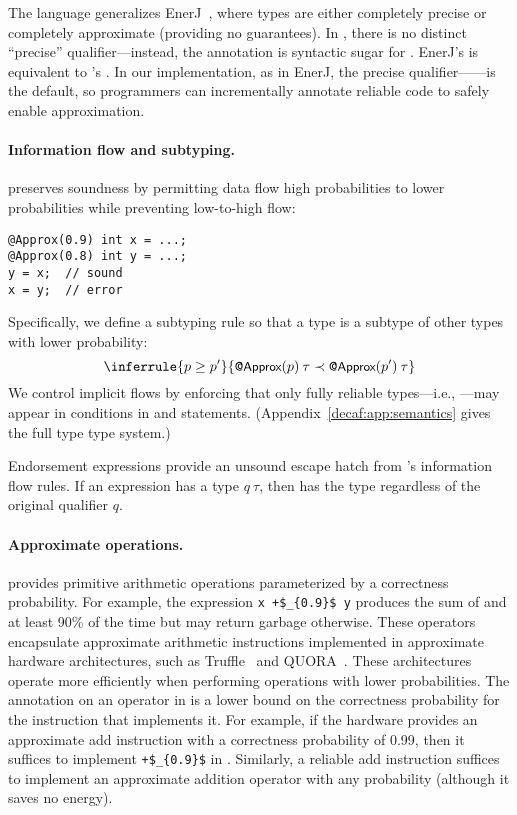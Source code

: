 {The language generalizes EnerJ~\cite{enerj}, where types are either
completely precise or completely approximate (providing no guarantees).
In \lang, there is no distinct ``precise'' qualifier---instead, the
 annotation is syntactic sugar for .
EnerJ's  is equivalent to \lang's .
In our implementation, as in EnerJ, the precise
qualifier------is the default, so programmers can
incrementally annotate reliable code to safely enable approximation.

\paragraph{Information flow and subtyping.}
\lang preserves soundness by permitting data flow high probabilities
to lower probabilities while preventing low-to-high flow:
%
\begin{lstlisting}
@Approx(0.9) int x = ...;
@Approx(0.8) int y = ...;
y = x;  // sound
x = y;  // error
\end{lstlisting}
%
Specifically, we define a subtyping rule so that a type is a subtype of
other types with lower probability:
%
\[
    \inferrule
        {p \geq p'}
        {\ApproxN{p} \> \tau
         \prec \ApproxN{p'} \> \tau}
\]
%
We control implicit flows by enforcing that only fully reliable types---i.e.,
---may appear in conditions in  and
 statements.
(Appendix~\ref{decaf:app:semantics} gives the full type type system.)

Endorsement expressions provide an unsound escape hatch from \lang's
information flow rules.
If an expression  has a type $q \> \tau$, then 
has the type  regardless of the original qualifier
$q$.


\paragraph{Approximate operations.}
\lang provides primitive arithmetic operations parameterized by a correctness
probability.
For example, the expression \lstinline!x +$_{0.9}$ y! produces the sum of 
and  at least 90\% of the time but may return garbage otherwise.
These operators encapsulate approximate arithmetic instructions implemented in
approximate hardware architectures, such as Truffle~\cite{truffle} and
QUORA~\cite{quora}.
These architectures operate more efficiently when performing operations with
lower probabilities.
The annotation on an operator in \lang is a lower bound on the
correctness probability for the instruction that implements it.
For example, if the hardware provides an approximate add instruction
with a correctness probability of 0.99, then it suffices to implement
\lstinline!+$_{0.9}$! in \lang.
Similarly, a reliable add instruction suffices to implement an approximate
addition operator with any probability (although it saves no energy).

}
